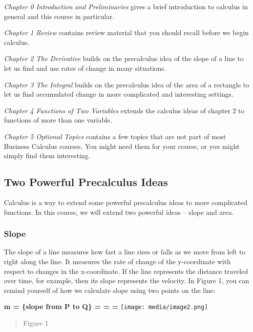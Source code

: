 \emph{Chapter 0 Introduction and Preliminaries} gives a brief
introduction to calculus in general and this course in particular.

\emph{Chapter 1 Review} contains review material that you should recall
before we begin calculus.

\emph{Chapter 2 The Derivative} builds on the precalculus idea of the
slope of a line to let us find and use rates of change in many
situations.

\emph{Chapter 3 The Integral} builds on the precalculus idea of the area
of a rectangle to let us find accumulated change in more complicated and
interesting settings.

\emph{Chapter 4 Functions of Two Variables} extends the calculus ideas
of chapter 2 to functions of more than one variable.

\emph{Chapter 5 Optional Topics} contains a few topics that are not part
of most Business Calculus courses. You might need them for your course,
or you might simply find them interesting.

\hypertarget{two-powerful-precalculus-ideas}{\subsection{Two Powerful
Precalculus Ideas }\label{two-powerful-precalculus-ideas}}

Calculus is a way to extend some powerful precalculus ideas to more
complicated functions. In this course, we will extend two powerful ideas
-- slope and area.

\subsubsection{\texorpdfstring{\textbf{Slope}}{Slope}}\label{slope}

The slope of a line measures how fast a line rises or falls as we move
from left to right along the line. It measures the rate of change of the
y-coordinate with respect to changes in the x-coordinate. If the line
represents the distance traveled over time, for example, then its slope
represents the velocity. In Figure 1, you can remind yourself of how we
calculate slope using two points on the line:

\textbf{m = \{slope from P to Q\} = = =}
\texttt{[image: media/image2.png]}

\begin{quote}
Figure 1
\end{quote}

